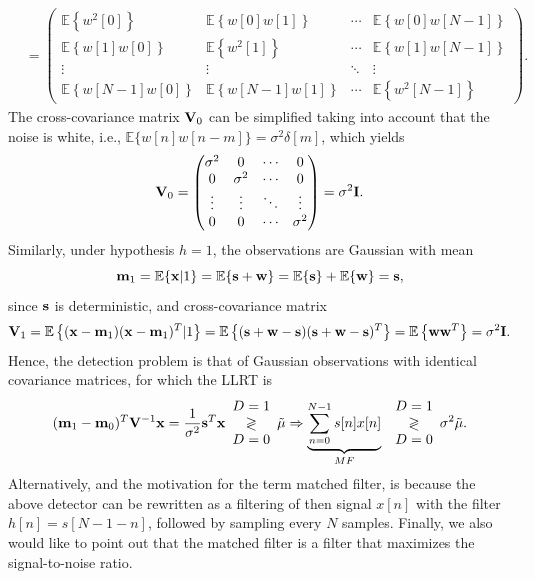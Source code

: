 \begin{example}
\begin{align*}
		&= \begin{pmatrix} \mathbb{E}\left\{w^2[0]\right\}  & \mathbb{E}\left\{w[0]w[1] \right\}& \cdots & \mathbb{E}\left\{w[0]w[N-1]\right\} \\ \mathbb{E}\left\{w[1] w[0]\right\} & \mathbb{E}\left\{w^2[1]\right\} & \cdots & \mathbb{E}\left\{w[1]w[N-1]\right\} \\ \vdots & \vdots & \ddots & \vdots   \\ \mathbb{E}\left\{w[N-1] w[0]\right\} & \mathbb{E}\left\{w[N-1] w[1]\right\} & \cdots & \mathbb{E}\left\{w^2[N-1] \right\} \end{pmatrix}.
 	\end{align*}
	The cross-covariance matrix ${\bf V}_0$ can be simplified taking into account that the noise is white, i.e., $\mathbb{E}\{w[n] w[n-m]\} = \sigma^2 \delta[m]$, which yields 
	\begin{equation*}
		{\bf V}_0 = \begin{pmatrix} \sigma^2  & 0 & \cdots & 0 \\ 0 & \sigma^2 & \cdots & 0 \\ \vdots & \vdots & \ddots & \vdots   \\ 0 & 0 & \cdots & \sigma^2 \end{pmatrix} = \sigma^2 \mathbf{I}.
\end{equation*}
Similarly, under hypothesis $h=1$, the observations are Gaussian with mean
\begin{equation*}
	{\bf m}_1 = \mathbb{E}\{{\bf x}|1\} = \mathbb{E}\{{\bf s} + {\bf w}\} = \mathbb{E}\{{\bf s}\} + \mathbb{E}\{{\bf w}\} = {\bf s},
\end{equation*}
since ${\bf s}$ is deterministic, and cross-covariance matrix
	\begin{equation*}
{\bf V}_1 = \mathbb{E}\left\{({\bf x} - {\bf m}_1) ({\bf x} - {\bf m}_1)^T|1\right\} = \mathbb{E}\left\{({\bf s} + {\bf w} - {\bf s}) ({\bf s} + {\bf w} - {\bf s})^T\right\} = \mathbb{E}\left\{{\bf w} {\bf w}^T\right\} = \sigma^2 \mathbf{I}.
\end{equation*}
Hence, the detection problem is that of Gaussian observations with identical covariance matrices, for which the LLRT is
\begin{equation*}
({\bf m}_1-{\bf m}_0)^T {\bf V}^{-1}{\bf x} = \frac{1}{\sigma^2} {\bf s}^T {\bf x} \dunodcero \tilde{\mu} \Rightarrow \underbrace{\sum_{n = 0}^{N-1} s[n]x[n]}_{MF} \ \dunodcero \sigma^2 \tilde{\mu}.
\end{equation*}
Alternatively, and the motivation for the term matched filter, is because the above detector can be rewritten as a filtering of then signal $x[n]$ with the filter $h[n] = s[N-1 - n]$, followed by sampling every $N$ samples. Finally, we also would like to point out that the matched filter is a filter that maximizes the signal-to-noise ratio.

\end{example}

